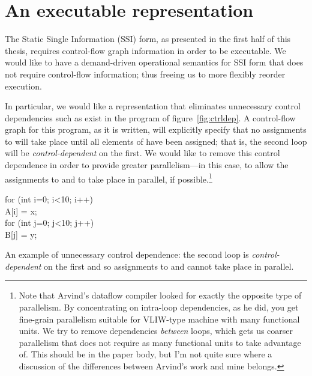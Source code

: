\documentclass[12pt,titlepage,twoside]{article}
\let\oldsection\section
\renewcommand{\section}{\setcounter{figure}{0}\setcounter{table}{0}\oldsection}
\begin{document}
\section{An executable representation}\label{sec:ssiplus}
The Static Single Information (SSI) form, as presented in the first
half of this thesis,
requires control-flow graph information in order to be executable. We
would like to have a demand-driven operational semantics for SSI form
that does not require control-flow information; thus freeing us to
more flexibly reorder execution.

In particular, we would like a representation that eliminates
unnecessary control dependencies such as exist in the program of
figure~\vref{fig:ctrldep}.  A control-flow graph for this program, as
it is written, will explicitly specify that no assignments to
 will take place until all elements of  have
been assigned; that is, the second loop will be
\emph{control-dependent} on the first.  We would like to remove this
control dependence in order to provide greater parallelism---in this
case, to allow the assignments to  and  to
take place in parallel, if possible.\footnote{Note that Arvind's
dataflow compiler \cite{traub86:ttda} looked for exactly the opposite type of
parallelism.  By concentrating on intra-loop dependencies, as he did, you get
fine-grain parallelism suitable for VLIW-type machine with many
functional units.  We try to remove dependencies \emph{between} loops,
which gets us coarser parallelism that does not require as many
functional units to take advantage of.  This should be in the paper
body, but I'm not quite sure where a discussion of the differences
between Arvind's work and mine belongs.}

\begin{myfigure}[t]
\begin{samplecode}
for (int i=0; i<10; i++)\\
\>A[i] = x;\\
for (int j=0; j<10; j++)\\
\>B[j] = y;\\
\end{samplecode}
\caption[An example of unnecessary control dependence.]
{An example of unnecessary control dependence: the second loop
is \emph{control-dependent} on the first and so assignments to
 and  cannot take place in parallel.}
\label{fig:ctrldep}
\end{myfigure}
\end{document}
